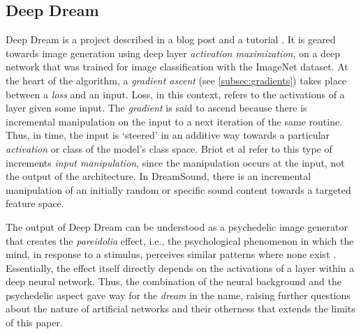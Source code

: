 \documentclass[a4paper,10pt,oneside]{article}
\begin{document}
\begin{sloppy}
\subsection{Deep Dream}
Deep Dream is a project described in a blog post \cite{Mordvintsev2015} and a tutorial \cite{DeepDreamTutorial}. It is geared towards image generation using deep layer \textit{activation maximization}, on a deep network \cite{szegedy2014going} that was trained for image classification with the ImageNet \cite{ILSVRC15} dataset. At the heart of the algorithm, a \textit{gradient ascent} (see \ref{subsec:gradients}) takes place between a \textit{loss} and an input. Loss, in this context, refers to the activations of a layer given some input. The \textit{gradient} is said to ascend because there is incremental manipulation on the input to a next iteration of the same routine. Thus, in time, the input is `steered' in an additive way towards a particular \textit{activation} or class of the model's class space. Briot et al \cite{Briot2017} refer to this type of increments \textit{input manipulation}, since the manipulation occurs at the input, not the output of the architecture. In DreamSound, there is an incremental manipulation of an initially random or specific sound content towards a targeted feature space.

The output of Deep Dream can be understood as a psychedelic image generator that creates the \textit{pareidolia} effect, i.e., the psychological phenomenon in which the mind, in response to a stimulus, perceives similar patterns where none exist \cite{Briot2017}. Essentially, the effect itself directly depends on the activations of a layer within a deep neural network. Thus, the combination of the neural background and the psychedelic aspect gave way for the \textit{dream} in the name, raising further questions about the nature of artificial networks and their otherness that extends the limits of this paper.



\end{sloppy}
\end{document}
